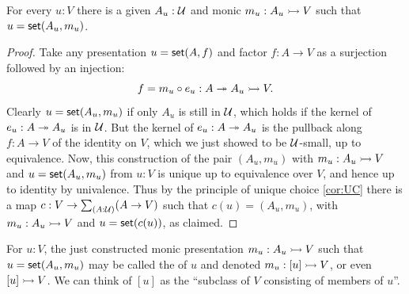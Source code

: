 \begin{lem}\label{lem:MonicSetPresent}
For every $u:V$ there is a given $A_u:\mathcal{U}$ and monic $m_u: A_u \rightarrowtail V$ such that $u = \mathsf{set}(A_u, m_u)$.
\end{lem}

\begin{proof}
  Take any presentation $u = \mathsf{set}(A,f)$ and factor $f:A\to V$ as a surjection followed by an injection:
  \begin{equation*}
    f = m_u\circ e_u : A \twoheadrightarrow A_u \rightarrowtail V.
  \end{equation*}
  Clearly $u = \mathsf{set}(A_u, m_u)$ if only $A_u$ is still in $\mathcal{U}$, which holds if the kernel of $e_u : A \twoheadrightarrow A_u$ is in $\mathcal{U}$.  But the kernel of $e_u : A \twoheadrightarrow A_u$ is the pullback along $f : A\to V$ of the identity on $V$, which we just showed to be $\mathcal{U}$-small, up to equivalence.  Now, this construction of the pair $(A_u, m_u)$ with $m_u :A_u \rightarrowtail V$ and $u = \mathsf{set}(A_u, m_u)$ from $u:V$ is unique up to equivalence over $V$, and hence up to identity by univalence.  Thus by the principle of unique choice \eqref{cor:UC} there is a map $c : V\to\sm{A:\UU}(A\to V)$ such that $c(u) = (A_u, m_u)$, with $m_u :A_u \rightarrowtail V$ and $u = \mathsf{set}(c(u))$, as claimed.
\end{proof}

\begin{defn}\label{def:TypeOfElements}
  For $u:V$, the just constructed monic presentation $m_u: A_u \rightarrowtail V$ such that $u = \mathsf{set}(A_u, m_u)$ may be called the 
  of $u$ and denoted $m_u : [u] \rightarrowtail V$, or even $[u] \rightarrowtail V$.  We can think of $[u]$ as the ``subclass of $V$ consisting of members of $u$''.
\end{defn}

